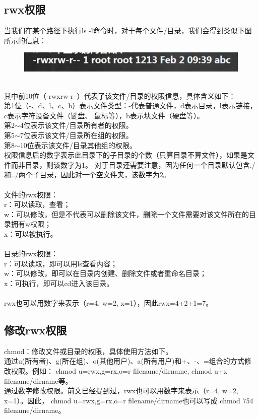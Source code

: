 \documentclass[11pt]{article}
\begin{document}
\subsection{rwx权限}
 当我们在某个路径下执行ls -l命令时，对于每个文件/目录，我们会得到类似下图所示的信息：
\begin{figure}[htb]
    \centering
    \includegraphics[scale=0.4]{imgs/rwx_info.png}
\end{figure}
\\
其中前10位（-rwxrw-r--）代表了该文件/目录的权限信息，具体含义如下：  \\
第1位（-、d、l、c、b）表示文件类型：-代表普通文件，d表示目录，l表示链接，c表示字符设备文件（键盘、
鼠标等），b表示块文件（硬盘等）。  \\
第2$\sim$4位表示该文件/目录所有者的权限。  \\
第5$\sim$7位表示该文件/目录所在组的权限。  \\
第8$\sim$10位表示该文件/目录其他组的权限。  \\
权限信息后的数字表示此目录下的子目录的个数（只算目录不算文件），如果是文件而非目录，则该数字为1。
对于目录还需要注意，因为任何一个目录默认包含./和../两个子目录，因此对一个空文件夹，该数字为2。\\\\
 文件的rwx权限：  \\
r：可以读取，查看；  \\
w：可以修改，但是不代表可以删除该文件，删除一个文件需要对该文件所在的目录拥有w权限；  \\
x：可以被执行。  \\\\
 目录的rwx权限：  \\
r：可以读取，即可以用ls查看内容；  \\
w：可以修改，即可以在目录内创建、删除文件或者重命名目录；  \\
x：可执行，即可以cd进入该目录。 \\\\
 rwx也可以用数字来表示（r=4, w=2, x=1），因此rwx=4+2+1=7。

\subsection{修改rwx权限}
chmod：修改文件或目录的权限，具体使用方法如下。  \\
 通过u(所有者)、g(所在组)、o(其他用户)、a(所有用户)和+、-、=组合的方式修改权限。例如：
chmod u=rwx,g=rx,o=r filename/dirname, \quad chmod u+x filename/dirname等。\\
 通过数字修改权限。前文已经提到过，rwx也可以用数字来表示（r=4, w=2, x=1）。因此，
chmod u=rwx,g=rx,o=r filename/dirname也可以写成 chmod 754 filename/dirname。
\end{document}
